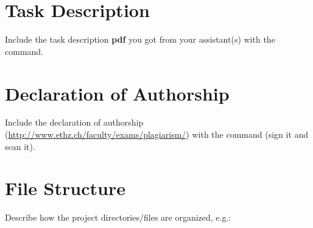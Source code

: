 
\chapter{Task Description}
Include the task description \textbf{pdf} you got from your
assistant(s) with the  command.



\chapter{Declaration of Authorship}
Include the declaration of authorship (\url{http://www.ethz.ch/faculty/exams/plagiarism/}) with the  command
(sign it and scan it).
%


\chapter{File Structure}
Describe how the project directories/files are organized, e.g.:

\begin{flushleft}
\end{flushleft}

